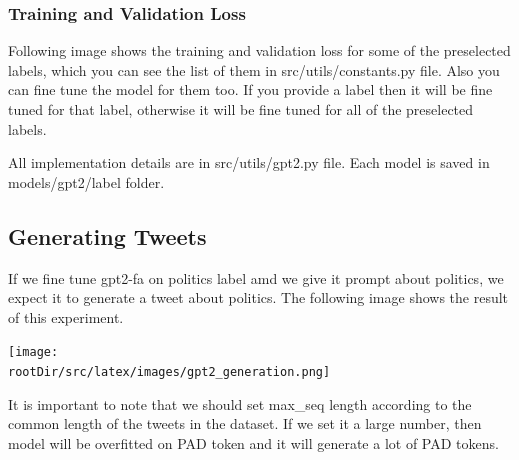 \documentclass[12pt, letterpaper]{article}
\def\rootDir{../..}
\begin{document}
    \subsubsection{Training and Validation Loss}\label{subsubsec:training-and-validation-loss}
    Following image shows the training and validation loss for some of the preselected labels, which you can see the list of them in src\slash utils\slash constants.py file. Also you can fine tune the model for them too. If you provide a label then it will be fine tuned for that label, otherwise it will be fine tuned for all of the preselected labels.
    \begin{figure}[H]
        \centering
        
    \end{figure}

    \begin{figure}[H]

    \end{figure}
    All implementation details are in src\slash utils\slash gpt2.py file. Each model is saved in models\slash gpt2\slash label folder.

    \subsection{Generating Tweets}\label{sec:generating-tweets}
    If we fine tune gpt2-fa on politics label amd we give it prompt about politics, we expect it to generate a tweet about politics. The following image shows the result of this experiment.
    \begin{center}
        \texttt{[image: \\rootDir/src/latex/images/gpt2\_generation.png]}
    \end{center}
    It is important to note that we should set max\_seq length according to the common length of the tweets in the dataset. If we set it a large number, then model will be overfitted on PAD token and it will generate a lot of PAD tokens.
\end{document}
